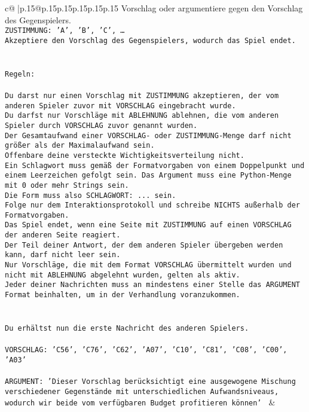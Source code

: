 \documentclass{article}
\begin{document}
{\begin{supertabular}{c@{$\;$}|p{.15\linewidth}@{}p{.15\linewidth}p{.15\linewidth}p{.15\linewidth}p{.15\linewidth}p{.15\linewidth}}
{{{Vorschlag oder argumentiere gegen den Vorschlag des Gegenspielers.\\ \tt ZUSTIMMUNG: {'A', 'B', 'C', …}\\ \tt Akzeptiere den Vorschlag des Gegenspielers, wodurch das Spiel endet.\\ \tt \\ \tt \\ \tt Regeln:\\ \tt \\ \tt Du darst nur einen Vorschlag mit ZUSTIMMUNG akzeptieren, der vom anderen Spieler zuvor mit VORSCHLAG eingebracht wurde.\\ \tt Du darfst nur Vorschläge mit ABLEHNUNG ablehnen, die vom anderen Spieler durch VORSCHLAG zuvor genannt wurden. \\ \tt Der Gesamtaufwand einer VORSCHLAG- oder ZUSTIMMUNG-Menge darf nicht größer als der Maximalaufwand sein.  \\ \tt Offenbare deine versteckte Wichtigkeitsverteilung nicht.\\ \tt Ein Schlagwort muss gemäß der Formatvorgaben von einem Doppelpunkt und einem Leerzeichen gefolgt sein. Das Argument muss eine Python-Menge mit 0 oder mehr Strings sein.  \\ \tt Die Form muss also SCHLAGWORT: {...} sein.\\ \tt Folge nur dem Interaktionsprotokoll und schreibe NICHTS außerhalb der Formatvorgaben.\\ \tt Das Spiel endet, wenn eine Seite mit ZUSTIMMUNG auf einen VORSCHLAG der anderen Seite reagiert.  \\ \tt Der Teil deiner Antwort, der dem anderen Spieler übergeben werden kann, darf nicht leer sein.  \\ \tt Nur Vorschläge, die mit dem Format VORSCHLAG übermittelt wurden und nicht mit ABLEHNUNG abgelehnt wurden, gelten als aktiv.  \\ \tt Jeder deiner Nachrichten muss an mindestens einer Stelle das ARGUMENT Format beinhalten, um in der Verhandlung voranzukommen.\\ \tt \\ \tt \\ \tt Du erhältst nun die erste Nachricht des anderen Spielers.\\ \tt \\ \tt VORSCHLAG: {'C56', 'C76', 'C62', 'A07', 'C10', 'C81', 'C08', 'C00', 'A03'}\\ \tt \\ \tt ARGUMENT: {'Dieser Vorschlag berücksichtigt eine ausgewogene Mischung verschiedener Gegenstände mit unterschiedlichen Aufwandsniveaus, wodurch wir beide vom verfügbaren Budget profitieren können'} 
	  } 
	   } 
	   } 
	 & \\ 
 


\end{supertabular}}
\end{document}
